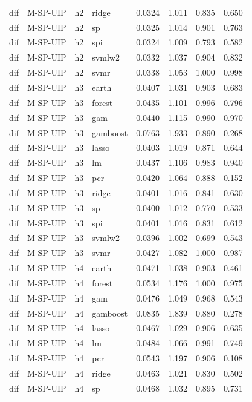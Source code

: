 \begin{ThreePartTable}
\begin{longtable}[t]{llclcccc}
dif & M-SP-UIP & h2 & ridge & 0.0324 & 1.011 & 0.835 & 0.650\\
dif & M-SP-UIP & h2 & sp & 0.0325 & 1.014 & 0.901 & 0.763\\
dif & M-SP-UIP & h2 & spi & 0.0324 & 1.009 & 0.793 & 0.582\\
dif & M-SP-UIP & h2 & svmlw2 & 0.0332 & 1.037 & 0.904 & 0.832\\
dif & M-SP-UIP & h2 & svmr & 0.0338 & 1.053 & 1.000 & 0.998\\
\addlinespace
dif & M-SP-UIP & h3 & earth & 0.0407 & 1.031 & 0.903 & 0.683\\
dif & M-SP-UIP & h3 & forest & 0.0435 & 1.101 & 0.996 & 0.796\\
dif & M-SP-UIP & h3 & gam & 0.0440 & 1.115 & 0.990 & 0.970\\
dif & M-SP-UIP & h3 & gamboost & 0.0763 & 1.933 & 0.890 & 0.268\\
dif & M-SP-UIP & h3 & lasso & 0.0403 & 1.019 & 0.871 & 0.644\\
dif & M-SP-UIP & h3 & lm & 0.0437 & 1.106 & 0.983 & 0.940\\
dif & M-SP-UIP & h3 & pcr & 0.0420 & 1.064 & 0.888 & 0.152\\
dif & M-SP-UIP & h3 & ridge & 0.0401 & 1.016 & 0.841 & 0.630\\
dif & M-SP-UIP & h3 & sp & 0.0400 & 1.012 & 0.770 & 0.533\\
dif & M-SP-UIP & h3 & spi & 0.0401 & 1.016 & 0.831 & 0.612\\
dif & M-SP-UIP & h3 & svmlw2 & 0.0396 & 1.002 & 0.699 & 0.543\\
dif & M-SP-UIP & h3 & svmr & 0.0427 & 1.082 & 1.000 & 0.987\\
\addlinespace
dif & M-SP-UIP & h4 & earth & 0.0471 & 1.038 & 0.903 & 0.461\\
dif & M-SP-UIP & h4 & forest & 0.0534 & 1.176 & 1.000 & 0.975\\
dif & M-SP-UIP & h4 & gam & 0.0476 & 1.049 & 0.968 & 0.543\\
dif & M-SP-UIP & h4 & gamboost & 0.0835 & 1.839 & 0.880 & 0.278\\
dif & M-SP-UIP & h4 & lasso & 0.0467 & 1.029 & 0.906 & 0.635\\
dif & M-SP-UIP & h4 & lm & 0.0484 & 1.066 & 0.991 & 0.749\\
dif & M-SP-UIP & h4 & pcr & 0.0543 & 1.197 & 0.906 & 0.108\\
dif & M-SP-UIP & h4 & ridge & 0.0463 & 1.021 & 0.830 & 0.502\\
dif & M-SP-UIP & h4 & sp & 0.0468 & 1.032 & 0.895 & 0.731\\

\end{longtable}
\end{ThreePartTable}
